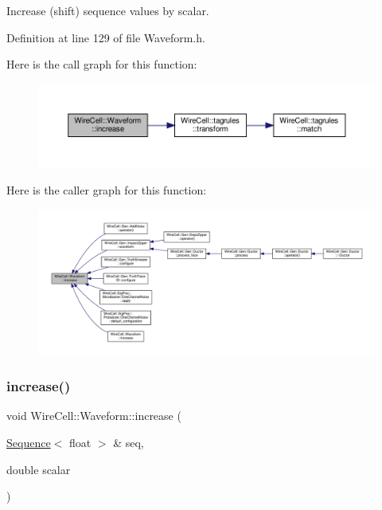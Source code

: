 Increase (shift) sequence values by scalar. 



Definition at line 129 of file Waveform.\+h.

Here is the call graph for this function\+:
\nopagebreak
\begin{figure}[H]
\begin{center}
\leavevmode
\includegraphics[width=350pt]{namespace_wire_cell_1_1_waveform_af74deccaeb9e2147865029e16840e799_cgraph}
\end{center}
\end{figure}
Here is the caller graph for this function\+:
\nopagebreak
\begin{figure}[H]
\begin{center}
\leavevmode
\includegraphics[width=350pt]{namespace_wire_cell_1_1_waveform_af74deccaeb9e2147865029e16840e799_icgraph}
\end{center}
\end{figure}
\mbox{\label{namespace_wire_cell_1_1_waveform_a3e92e2c63b937617bf8870412e7a6da7}} 
\subsubsection{\texorpdfstring{increase()}{increase()}\hspace{0.1cm}{\footnotesize\ttfamily [2/3]}}
{\footnotesize\ttfamily void Wire\+Cell\+::\+Waveform\+::increase (\begin{DoxyParamCaption}\item[{\hyperlink{namespace_wire_cell_1_1_waveform_a1d2a1b672e3b220dcd64a994531de95d}{Sequence}$<$ float $>$ \&}]{seq,  }\item[{double}]{scalar }\end{DoxyParamCaption})\hspace{0.3cm}{\ttfamily [inline]}}



